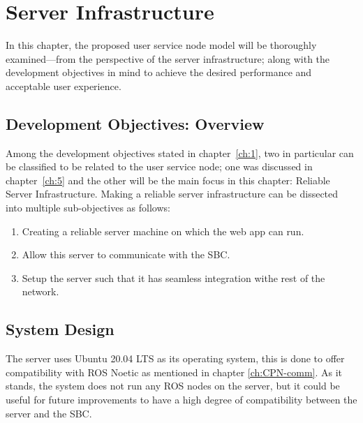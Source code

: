 
\newpage

\chapter{Server Infrastructure}
In this chapter, the proposed user service node model will be thoroughly examined---from the perspective of the server infrastructure; along with the development objectives in mind to achieve the desired performance and acceptable user experience.

\section{Development Objectives: Overview}
Among the development objectives stated in chapter~\ref{ch:1}, two in particular can be classified to be related to the user service node; one was discussed in chapter~\ref{ch:5} and the other will be the main focus in this chapter: Reliable Server Infrastructure. Making a reliable server infrastructure can be dissected into multiple sub-objectives as follows:
\begin{enumerate}
    \item Creating a reliable server machine on which the web app can run.
    \item Allow this server to communicate with the SBC.
    \item Setup the server such that it has seamless integration withe rest of the network.
\end{enumerate}



\section{System Design}
The server uses Ubuntu 20.04 LTS as its operating system, this is done to offer compatibility with ROS Noetic as mentioned in chapter \ref{ch:CPN-comm}. As it stands, the system does not run any ROS nodes on the server, but it could be useful for future improvements to have a high degree of compatibility between the server and the SBC.

